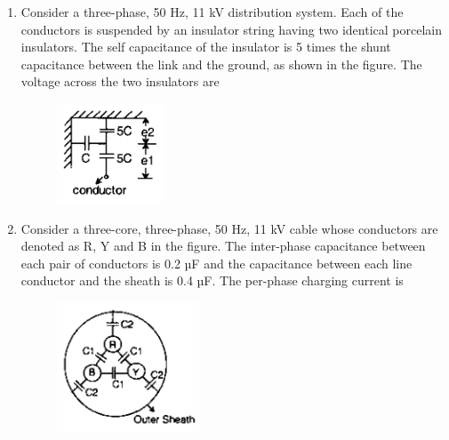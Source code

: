 \documentclass[12pt]{article}
\theoremstyle{remark}
\begin{document}
\begin{enumerate}
\item Consider a three-phase, 50 Hz, 11 kV distribution system. Each of the conductors is suspended by an insulator string having two identical porcelain insulators. The self capacitance of the insulator is 5 times the shunt capacitance between the link and the ground, as shown in the figure. The voltage across the two insulators are
\begin{figure}[H]
    \centering
    \includegraphics[width=0.3\textwidth]{Figs/Q42.png}
    \caption{}
    \label{fig:1.32}
\end{figure}
\begin{enumerate}
\end{enumerate}
\hfill{}

\item Consider a three-core, three-phase, 50 Hz, 11 kV cable whose conductors are denoted as R, Y and B in the figure. The inter-phase capacitance  between each pair of conductors is 0.2 µF and the capacitance between each line conductor and the sheath is 0.4 µF. The per-phase charging current is
\begin{figure}[H]
    \centering
    \includegraphics[width=0.4\textwidth]{Figs/Q43.png}
    \caption{}
    \label{fig:1.33}
\end{figure}
\begin{enumerate}
\end{enumerate}
\hfill{}


\end{enumerate}
\end{document}
